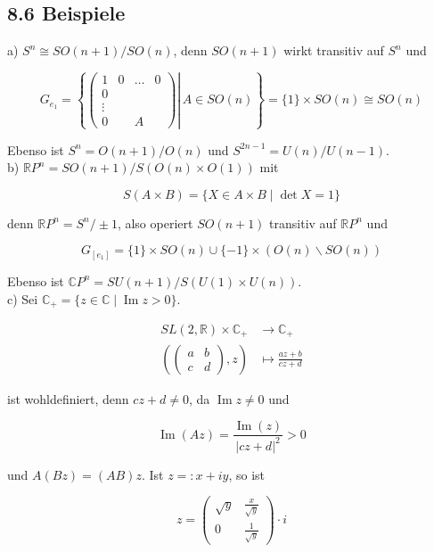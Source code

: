 \documentclass[10pt, letterpaper]{article}
\begin{document}
\subsection*{8.6 Beispiele}
a) $S^{n} \cong S O(n+1) / S O(n)$, denn $S O(n+1)$ wirkt transitiv auf $S^{n}$ und

$$
G_{e_{1}}=\left\{\left.\left(\begin{array}{cccc}
1 & 0 & \ldots & 0 \\
0 & & & \\
\vdots & & & \\
0 & & A &
\end{array}\right) \right\rvert\, A \in S O(n)\right\}=\{1\} \times S O(n) \cong S O(n)
$$

Ebenso ist $S^{n}=O(n+1) / O(n)$ und $S^{2 n-1}=U(n) / U(n-1)$.\\
b) $\mathbb{R} P^{n}=S O(n+1) / S(O(n) \times O(1))$ mit

$$
S(A \times B)=\{X \in A \times B \mid \operatorname{det} X=1\}
$$

denn $\mathbb{R} P^{n}=S^{n} / \pm 1$, also operiert $S O(n+1)$ transitiv auf $\mathbb{R} P^{n}$ und

$$
G_{\left[e_{1}\right]}=\{1\} \times S O(n) \cup\{-1\} \times(O(n) \backslash S O(n))
$$

Ebenso ist $\mathbb{C} P^{n}=S U(n+1) / S(U(1) \times U(n))$.\\
c) Sei $\mathbb{C}_{+}=\{z \in \mathbb{C} \mid \operatorname{Im} z>0\}$.

$$
\begin{aligned}
S L(2, \mathbb{R}) \times \mathbb{C}_{+} & \rightarrow \mathbb{C}_{+} \\
\left(\left(\begin{array}{ll}
a & b \\
c & d
\end{array}\right), z\right) & \mapsto \frac{a z+b}{c z+d}
\end{aligned}
$$

ist wohldefiniert, denn $c z+d \neq 0$, da $\operatorname{Im} z \neq 0$ und

$$
\operatorname{Im}(A z)=\frac{\operatorname{Im}(z)}{|c z+d|^{2}}>0
$$

und $A(B z)=(A B) z$. Ist $z=: x+i y$, so ist

$$
z=\left(\begin{array}{cc}
\sqrt{y} & \frac{x}{\sqrt{y}} \\
0 & \frac{1}{\sqrt{y}}
\end{array}\right) \cdot i
$$
\end{document}

